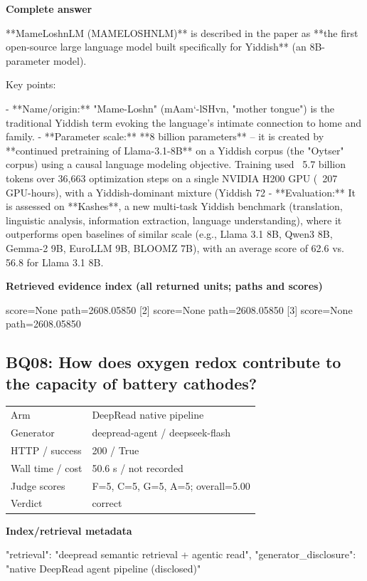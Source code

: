 \documentclass[10pt]{article}
\begin{document}
\textbf{Complete answer}
\begin{AnswerText}
**MameLoshnLM (MAMELOSHNLM)** is described in the paper as **the first open-source large language model built specifically for Yiddish** (an 8B-parameter model).

Key points:

- **Name/origin:** "Mame-Loshn" (mAam`-lSHvn, "mother tongue") is the traditional Yiddish term evoking the language's intimate connection to home and family.
- **Parameter scale:** **8 billion parameters** -- it is created by **continued pretraining of Llama-3.1-8B** on a Yiddish corpus (the "Oytser" corpus) using a causal language modeling objective. Training used ~5.7 billion tokens over 36,663 optimization steps on a single NVIDIA H200 GPU (~207 GPU-hours), with a Yiddish-dominant mixture (Yiddish 72%
- **Evaluation:** It is assessed on **Kashes**, a new multi-task Yiddish benchmark (translation, linguistic analysis, information extraction, language understanding), where it outperforms open baselines of similar scale (e.g., Llama 3.1 8B, Qwen3 8B, Gemma-2 9B, EuroLLM 9B, BLOOMZ 7B), with an average score of 62.6 vs. 56.8 for Llama 3.1 8B.
\end{AnswerText}

\textbf{Retrieved evidence index (all returned units; paths and scores) }
\begin{EvidenceText}
[1] score=None path=2608.05850
[2] score=None path=2608.05850
[3] score=None path=2608.05850
\end{EvidenceText}
\subsection{BQ08: How does oxygen redox contribute to the capacity of battery cathodes?}
\begin{tabular}{@{}ll@{}}
Arm & DeepRead native pipeline\\
Generator & deepread-agent / deepseek-flash\\
HTTP / success & 200 / True\\
Wall time / cost & 50.6 s / not recorded\\
Judge scores & F=5, C=5, G=5, A=5; overall=5.00\\
Verdict & correct\\
\end{tabular}

\textbf{Index/retrieval metadata}
\begin{EvidenceText}
{
  "retrieval": "deepread semantic retrieval + agentic read",
  "generator_disclosure": "native DeepRead agent pipeline (disclosed)"
}
\end{EvidenceText}
\end{document}
